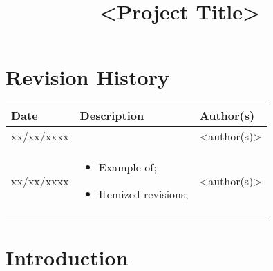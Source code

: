 \documentclass{article}
\title{<Project Title>}
\begin{document}
\newpage

\section*{\center Revision History}
  \vspace*{1cm}
  \begin{table}[ht]
    \centering
    \begin{tabular}[pos]{|m{2cm} | m{7.2cm} | m{3.8cm}|} 
      \hline
      \cellcolor[gray]{0.9}
      \textbf{Date} & \cellcolor[gray]{0.9}\textbf{Description} & \cellcolor[gray]{0.9}\textbf{Author(s)}\\ \hline
      \hline
      \small xx/xx/xxxx &  & \small <author(s)> \\ \hline      
      \small xx/xx/xxxx &
      \begin{small}
        \begin{itemize}
          \item Example of;
          \item Itemized revisions;
        \end{itemize}
      \end{small} & \small <author(s)> \\ \hline 
    \end{tabular}
  \end{table}

\newpage

\tableofcontents
\newpage

\section{Introduction}

% 
% 
\end{document}
